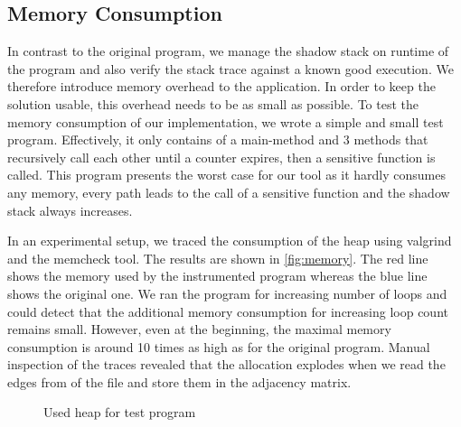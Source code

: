 \documentclass{llncs}
\begin{document}
\subsection{Memory Consumption}
In contrast to the original program, we manage the shadow stack on runtime of the program and also verify the stack trace against a known good execution. We therefore introduce memory overhead to the application. In order to keep the solution usable, this overhead needs to be as small as possible. To test the memory consumption of our implementation, we wrote a simple and small test program. Effectively, it only contains of a main-method and 3 methods that recursively call each other until a counter expires, then a sensitive function is called. This program presents the worst case for our tool as it hardly consumes any memory, every path leads to the call of a sensitive function and the shadow stack always increases.

In an experimental setup, we traced the consumption of the heap using valgrind and the memcheck tool. The results are shown in \autoref{fig:memory}. The red line shows the memory used by the instrumented program whereas the blue line shows the original one. We ran the program for increasing number of loops and could detect that the additional memory consumption for increasing loop count remains small. However, even at the beginning, the maximal memory consumption is around 10 times as high as for the original program. Manual inspection of the traces revealed that the allocation explodes when we read the edges from of the file and store them in the adjacency matrix.
\datatable

\begin{figure}
  \centering
  \vspace{-0.4cm}
  \caption{Used heap for test program}
  \label{fig:memory}
  \vspace{-0.4cm}
\end{figure}
\end{document}
